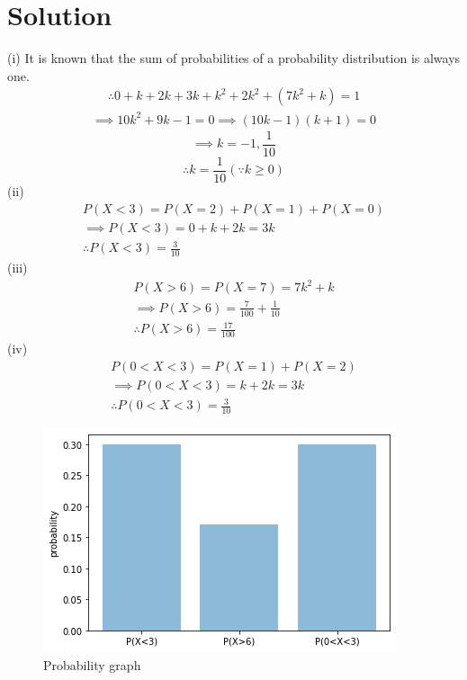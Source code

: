 \documentclass[journal,12pt,twocolumn]{IEEEtran}
\begin{document}
\section*{Solution}
(i)
It is known that the sum of probabilities of a probability distribution is always one.
\begin{align}
\tag{5.12.1}
    \therefore 0 + k + 2k + 3k + k^2 + 2k^2 + (7k^2 + k) = 1 
\end{align}
\begin{align}
\tag{5.12.2}
\implies 10k^2 + 9k - 1 = 0 
 \implies  (10k - 1)(k + 1) = 0 
 \end{align}
  \begin{equation}
  \tag{5.12.3}
 \implies  k = -1, \frac{1}{10} 
\end{equation}
\begin{equation}
    \tag{1}
 \therefore k = \frac{1}{10} (\because k \ge 0)
 \end{equation}
(ii)
\begin{align}
\tag{5.12.4}
P(X < 3) = P(X = 2) + P(X = 1) + P(X = 0) \\
\tag{5.12.5}
\implies  P(X < 3) = 0 + k + 2k = 3k \\
\tag{2}
\therefore  P(X < 3) = \frac{3}{10} 
   \end{align}
(iii)
\begin{align}
\tag{5.12.6}
P( X > 6) = P(X = 7) = 7k^2 + k \\
\tag{5.12.7}
\implies  P(X > 6)  = \frac{7}{100} + \frac{1}{10} \\
\tag{3}
\therefore P(X > 6) = \frac{17}{100} 
\end{align}
(iv) 
\begin{align}
\tag{5.12.8}
 P(0 < X < 3) = P(X = 1) + P(X = 2)  \\
 \tag{5.12.9}
              \implies   P(0 < X < 3) = k + 2k = 3k\\
\tag{4}              
    \therefore    P(0 < X < 3) = \frac{3}{10}
\end{align}
\begin{figure}[!htb]
    \centering    
	\includegraphics[width=\columnwidth]{probability.png}
    \caption{Probability graph}
\end{figure}
\end{document}
